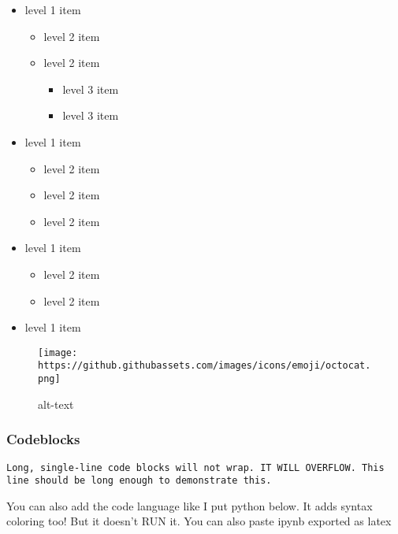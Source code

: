 \documentclass[a4paper,12pt]{article}
\providecommand{\tightlist}{%
  \setlength{\itemsep}{0pt}\setlength{\parskip}{0pt}}
\begin{document}
\begin{itemize}
\tightlist
\item
  level 1 item

  \begin{itemize}
  \tightlist
  \item
    level 2 item
  \item
    level 2 item

    \begin{itemize}
    \tightlist
    \item
      level 3 item
    \item
      level 3 item
    \end{itemize}
  \end{itemize}
\item
  level 1 item

  \begin{itemize}
  \tightlist
  \item
    level 2 item
  \item
    level 2 item
  \item
    level 2 item
  \end{itemize}
\item
  level 1 item

  \begin{itemize}
  \tightlist
  \item
    level 2 item
  \item
    level 2 item
  \end{itemize}
\item
  level 1 item
\end{itemize}

\begin{figure}
\centering
\texttt{[image: https://github.githubassets.com/images/icons/emoji/octocat.png]}
\caption{alt-text}
\end{figure}

\hypertarget{codeblocks}{%
\subsubsection{Codeblocks}\label{codeblocks}}

\begin{verbatim}
Long, single-line code blocks will not wrap. IT WILL OVERFLOW. This line should be long enough to demonstrate this.
\end{verbatim}

You can also add the code language like I put python below. It adds
syntax coloring too! But it doesn't RUN it. You can also paste ipynb
exported as latex
\end{document}
